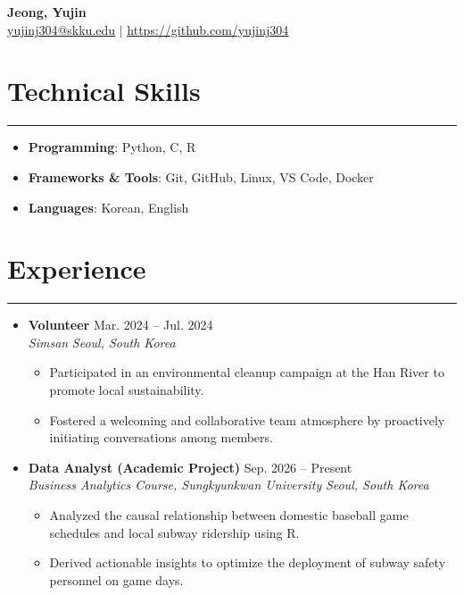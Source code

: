 \documentclass[letterpaper, 10pt]{article}
\begin{document}
 
\begin{center} 
\textbf{\LARGE Jeong, Yujin} \\ \vspace{2pt} 
\href{mailto:yujinj304@skku.edu}{\underline{yujinj304@skku.edu}} $|$ 
\href{https://github.com/yujinj304}{\underline{https://github.com/yujinj304}} 
\end{center} 
\section*{Technical Skills} 
\hrule 
\vspace{4pt} 
\begin{itemize} 
\item[] \textbf{Programming}: Python, C, R %
\item[] \textbf{Frameworks \& Tools}: Git, GitHub, Linux, VS Code, Docker %
\item[] \textbf{Languages}: Korean, English %
\end{itemize} 
\section*{Experience} 
\hrule 
\vspace{4pt} 
\begin{itemize} 
\item[] 
\textbf{Volunteer} \hfill Mar. 2024 -- Jul. 2024 \\ %
\textit{Simsan} \hfill \textit{Seoul, South Korea} 
\begin{itemize} 
\item Participated in an environmental cleanup campaign at the Han River to promote local sustainability.
\item Fostered a welcoming and collaborative team atmosphere by proactively initiating conversations among members.
\end{itemize} 
\item[] 
\textbf{Data Analyst (Academic Project)} \hfill Sep. 2026 -- Present \\ %
\textit{Business Analytics Course, Sungkyunkwan University} \hfill \textit{Seoul, South Korea} 
\begin{itemize} 
\item Analyzed the causal relationship between domestic baseball game schedules and local subway ridership using R.
\item Derived actionable insights to optimize the deployment of subway safety personnel on game days.
\end{itemize} 
\end{itemize} 
\end{document}
